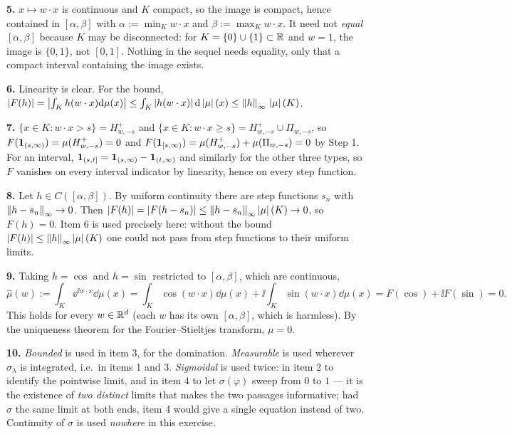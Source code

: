 \documentclass[11pt,a4paper]{article}
\begin{document}
\textbf{5.} $x\mapsto w\cdot x$ is continuous and $K$ compact, so the image is compact, hence
contained in $[\alpha,\beta]$ with $\alpha := \min_K w\cdot x$ and $\beta := \max_K w\cdot x$. It
need not \emph{equal} $[\alpha,\beta]$ because $K$ may be disconnected: for $K = \{0\}\cup\{1\}
\subset\mathbb{R}$ and $w = 1$, the image is $\{0,1\}$, not $[0,1]$. Nothing in the sequel needs equality,
only that a compact interval containing the image exists.

\textbf{6.} Linearity is clear. For the bound,
$\left\lvert F(h) \right\rvert = \left\lvert \int_K h(w\cdot x)\mathrm{d}\mu(x) \right\rvert \le \int_K \left\lvert h(w\cdot x) \right\rvert\mathrm{d}\left\lvert \mu \right\rvert(x)
\le \left\lVert h \right\rVert_\infty\,\left\lvert \mu \right\rvert(K)$.

\textbf{7.} $\{x \in K : w\cdot x > s\} = H^+_{w,-s}$ and
$\{x\in K : w\cdot x \ge s\} = H^+_{w,-s}\cup\Pi_{w,-s}$, so
$F(\mathbf{1}_{(s,\infty)}) = \mu(H^+_{w,-s}) = 0$ and
$F(\mathbf{1}_{[s,\infty)}) = \mu(H^+_{w,-s})+\mu(\Pi_{w,-s}) = 0$ by Step 1. For an interval,
$\mathbf{1}_{(s,t]} = \mathbf{1}_{(s,\infty)} - \mathbf{1}_{(t,\infty)}$ and similarly for the other three types, so
$F$ vanishes on every interval indicator by linearity, hence on every step function.

\textbf{8.} Let $h\in C([\alpha,\beta])$. By uniform continuity there are step functions $s_n$ with
$\left\lVert h - s_n \right\rVert_\infty\to0$. Then $\left\lvert F(h) \right\rvert = \left\lvert F(h-s_n) \right\rvert\le\left\lVert h-s_n \right\rVert_\infty\left\lvert \mu \right\rvert(K)\to0$,
so $F(h) = 0$. Item 6 is used precisely here: without the bound $\left\lvert F(h) \right\rvert\le\left\lVert h \right\rVert_\infty\left\lvert \mu \right\rvert(K)$
one could not pass from step functions to their uniform limits.

\textbf{9.} Taking $h = \cos$ and $h=\sin$ restricted to $[\alpha,\beta]$, which are continuous,
\[
\widehat\mu(w) := \int_K \ee^{\ii w\cdot x}\dd\mu(x)
= \int_K\cos(w\cdot x)\dd\mu(x) + \ii\int_K\sin(w\cdot x)\dd\mu(x) = F(\cos)+\ii F(\sin) = 0 .
\]
This holds for every $w\in\mathbb{R}^d$ (each $w$ has its own $[\alpha,\beta]$, which is harmless). By the
uniqueness theorem for the Fourier--Stieltjes transform, $\mu = 0$.

\textbf{10.} \emph{Bounded} is used in item 3, for the domination. \emph{Measurable} is used
wherever $\sigma_\lambda$ is integrated, i.e.\ in items 1 and 3. \emph{Sigmoidal} is used twice: in
item 2 to identify the pointwise limit, and in item 4 to let $\sigma(\varphi)$ sweep from $0$ to
$1$ --- it is the existence of \emph{two distinct} limits that makes the two passages informative;
had $\sigma$ the same limit at both ends, item 4 would give a single equation instead of two.
Continuity of $\sigma$ is used \emph{nowhere} in this exercise.
\end{document}
